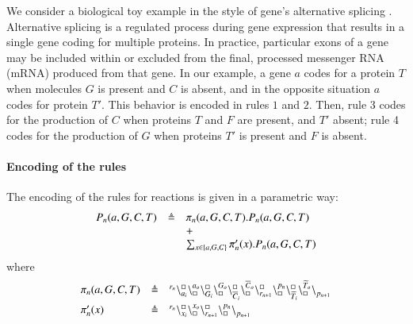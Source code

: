 \noindent
We consider a biological toy  example in the style of gene's alternative splicing \cite{WBB13}.
Alternative splicing is a regulated process during gene expression that results in a single gene 
coding for multiple proteins. 
In practice, particular exons of a gene may be included within or excluded from the final, 
processed messenger RNA (mRNA) produced from that gene.
 {\color{red} In our example,
a gene $a$  codes for a protein $T$ when molecules 
$G$ is present and $C$ is absent, and in the opposite situation $a$ codes for protein $T'$.}
This behavior is encoded in rules $1$ and $2$.
Then, rule 3 codes for the production of $C$ when proteins $T$ and $F$ are present, and $T'$ absent;
rule 4 codes for the production of $G$ when  proteins $T'$ is present and $F$ is absent.

\paragraph{Encoding of the rules}

The encoding of the rules for reactions is  given in a parametric way:
\[
\begin{array}{lcl}
P_n(a,G,C,T) & \triangleq &\pi_n(a,G,C,T).P_n(a,G,C,T)  \\
				&& +\\
			&&\sum_{x\in \{a,G,C\}} \pi'_n(x).P_n(a,G,C,T)
\end{array}
\]
where
\[
\begin{array}{lcl}
\pi_n(a,G,C,T) & \triangleq & {}^{r_n}\backslash_{a_i}^{\scriptstyle {\square}}\backslash_{\scriptstyle {\square}}^{a_o}
                                                    \backslash_{G_i}^{\scriptstyle {\square}}\backslash_{\scriptstyle {\square}}^{G_o}
                                                     \backslash_{\overline{C}_i}^{\scriptstyle {\square}}\backslash_{\scriptstyle {\square}}^{\overline{C}_o}
					        \backslash_{r_{n+1}}^{\scriptstyle {\square}}\backslash_{\scriptstyle {\square}}^{p_n}
					        \backslash_{\widetilde{T}_i}^{\scriptstyle {\square}}\backslash_{\scriptstyle {\square}}^{\widetilde{T}_o}
			\backslash_{p_{n+1}}^{}\\[6pt]
\pi'_n(x) &\triangleq &  {}^{r_n}\backslash_{x_i}^{\scriptstyle {\square}}\backslash_{\scriptstyle {\square}}^{x_o}\backslash_{r_{n+1}}^{\scriptstyle {\square}}\backslash_{\scriptstyle {\square}}^{p_n} \backslash_{p_{n+1}}^{} 
\end{array}
\]

